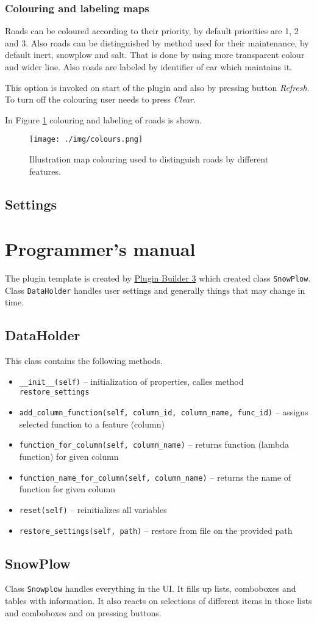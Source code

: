 \documentclass[12pt,a4paper]{article}
\newcommand{\cd}[1]{\texttt{#1}}
\begin{document}
\subsubsection{Colouring and labeling maps}
Roads can be coloured according to their priority, by default priorities are 1, 2 and 3. 
Also roads can be distinguished by method used for their maintenance, by default inert, snowplow and salt. 
That is done by using more transparent colour and wider line.
Also roads are labeled by identifier of car which maintains it.

\par This option is invoked on start of the plugin and also by pressing button \emph{Refresh}.
To turn off the colouring user needs to press \emph{Clear}.

\par In Figure \ref{colours} colouring and labeling of roads is shown.

\begin{figure}[H]\centering
\texttt{[image: ./img/colours.png]}
\caption{Illustration map colouring used to distinguish roads by different features.}
\label{colours}
\end{figure}

\subsection{Settings}

\section{Programmer's manual}
The plugin template is created by \href{http://g-sherman.github.io/Qgis-Plugin-Builder/}{Plugin Builder 3} which created class \cd{SnowPlow}.
Class \cd{DataHolder} handles user settings and generally things that may change in time.

\subsection{DataHolder}
This class contains the following methods.
\begin{itemize}
    \item \cd{\_\_init\_\_(self)} 
        – initialization of properties, calles method \cd{restore\_settings}
    \item \cd{add\_column\_function(self, column\_id, column\_name, func\_id)} 
        – assigns selected function to a feature (column)
    \item \cd{function\_for\_column(self, column\_name)}
        – returns function (lambda function) for given column 
    \item \cd{function\_name\_for\_column(self, column\_name)}
        – returns the name of function for given column
    \item \cd{reset(self)}
        – reinitializes all variables
    \item \cd{restore\_settings(self, path)}
        – restore from file on the provided path
\end{itemize}

\subsection{SnowPlow}
Class \cd{Snowplow} handles everything in the UI. 
It fills up lists, comboboxes and tables with information.
It also reacts on selections of different items in those lists and comboboxes and on pressing buttons.
\end{document}
